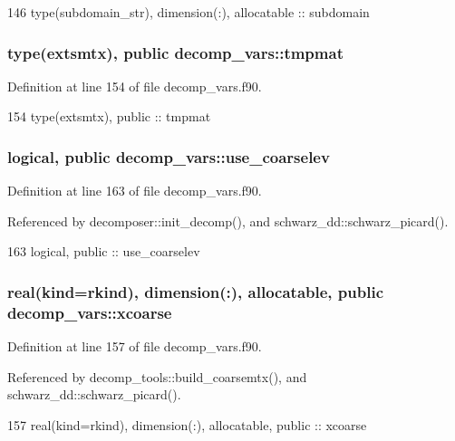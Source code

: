 \begin{DoxyCode}
146   \textcolor{keywordtype}{type}(subdomain_str), \textcolor{keywordtype}{dimension(:)}, \textcolor{keywordtype}{allocatable} :: subdomain
\end{DoxyCode}
\subsubsection[{tmpmat}]{\setlength{\rightskip}{0pt plus 5cm}type({\bf extsmtx}), public decomp\+\_\+vars\+::tmpmat}\label{namespacedecomp__vars_a2017e4787b58f14fa9d8b0b529d1d907}


Definition at line 154 of file decomp\+\_\+vars.\+f90.


\begin{DoxyCode}
154   \textcolor{keywordtype}{type}(extsmtx), \textcolor{keywordtype}{public} :: tmpmat
\end{DoxyCode}
\subsubsection[{use\+\_\+coarselev}]{\setlength{\rightskip}{0pt plus 5cm}logical, public decomp\+\_\+vars\+::use\+\_\+coarselev}\label{namespacedecomp__vars_ab7ad7b8db38e128e8d898cab899463b3}


Definition at line 163 of file decomp\+\_\+vars.\+f90.



Referenced by decomposer\+::init\+\_\+decomp(), and schwarz\+\_\+dd\+::schwarz\+\_\+picard().


\begin{DoxyCode}
163   \textcolor{keywordtype}{logical}, \textcolor{keywordtype}{public} :: use_coarselev
\end{DoxyCode}
\subsubsection[{xcoarse}]{\setlength{\rightskip}{0pt plus 5cm}real(kind=rkind), dimension(\+:), allocatable, public decomp\+\_\+vars\+::xcoarse}\label{namespacedecomp__vars_a4a1cbb5683777801ae03b0ed5ccd8b36}


Definition at line 157 of file decomp\+\_\+vars.\+f90.



Referenced by decomp\+\_\+tools\+::build\+\_\+coarsemtx(), and schwarz\+\_\+dd\+::schwarz\+\_\+picard().


\begin{DoxyCode}
157   \textcolor{keywordtype}{real(kind=rkind)}, \textcolor{keywordtype}{dimension(:)}, \textcolor{keywordtype}{allocatable}, \textcolor{keywordtype}{public} :: xcoarse
\end{DoxyCode}
